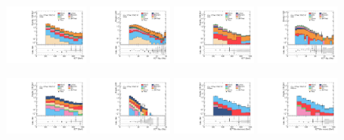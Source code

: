 \begin{figure}[ht!]

    \centering

    \includegraphics[width=0.24\textwidth]{images/analysis_EWK/v192_2_nosyst/can_VRW_met_et_afterFit.pdf}
    \includegraphics[width=0.24\textwidth]{images/analysis_EWK/v192_2_nosyst/can_VRW_met_sig_obj_afterFit.pdf}
    \includegraphics[width=0.24\textwidth]{images/analysis_EWK/v192_2_nosyst/can_VRT_met_et_afterFit.pdf}
    \includegraphics[width=0.24\textwidth]{images/analysis_EWK/v192_2_nosyst/can_VRT_met_sig_obj_afterFit.pdf}

    \includegraphics[width=0.24\textwidth]{images/analysis_EWK/v192_2_nosyst/can_VRE_met_et_afterFit.pdf}
    \includegraphics[width=0.24\textwidth]{images/analysis_EWK/v192_2_nosyst/can_VRE_met_sig_obj_afterFit.pdf}
    \includegraphics[width=0.24\textwidth]{images/analysis_EWK/v192_2_nosyst/can_VRZee_met_noele_et_afterFit.pdf}
    \includegraphics[width=0.24\textwidth]{images/analysis_EWK/v192_2_nosyst/can_VRZmm_met_nomuon_et_afterFit.pdf}


\end{figure}
